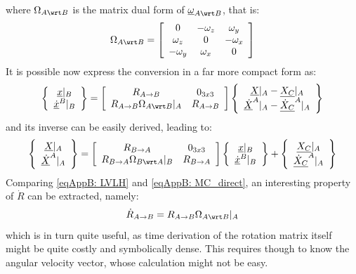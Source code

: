 	\noindent where $\Omega_{A\wrt B}$ is the matrix dual form of $\underline{\omega}_{A \wrt B}$, that is:
	\[
	\Omega_{A\wrt B} = \left[ \begin{array}{ccc}
			0 			& -\omega_z & \omega_y \\
			\omega_z 	& 0 		& -\omega_x \\
			-\omega_y 	& \omega_x 	& 0
			\end{array}\right]
	\]
	\indent It is possible now express the conversion in a far more compact form as:
	\begin{equation}
	\left\{ \begin{array}{c}
	\underline{x}\rvert_{B} \\
	\underline{\dot{x}}^{B}\rvert_{B}
	\end{array} \right\}
	= 
	\left[\begin{array}{cc}
	R_{A\to B} 								& 0_{3x3} \\
	R_{A\to B} \Omega_{A \wrt B} \rvert_{A} & R_{A\to B} 
	\end{array}\right]
	\left\{ \begin{array}{c}
	\underline{X}\rvert_{A} - \underline{X_C}\rvert_{A}\\
	\underline{\dot{X}}^{A}\rvert_{A} - \underline{\dot{X}_C}^{A}\rvert_{A}
	\end{array}\right\}
	\label{eqAppB: 	MC_direct}
	\end{equation}
	\noindent and its inverse can be easily derived, leading to:
	\begin{equation}
	\left\{ \begin{array}{c}
	\underline{X}\rvert_{A} \\
	\underline{\dot{X}}^{A}\rvert_{A}
	\end{array} \right\}
	= 
	\left[\begin{array}{cc}
	R_{B\to A} & 0_{3x3} \\
	R_{B\to A} \Omega_{B\wrt A} \rvert_{B} & R_{B\to A} 
	\end{array}\right]
	\left\{ \begin{array}{c}
	\underline{x}\rvert_{B} \\
	\underline{\dot{x}}^{B}\rvert_{B}
	\end{array}\right\} + 
	\left\{ \begin{array}{c}
	\underline{X_C}\rvert_{A} \\
	\underline{\dot{X}_C}^{A}\rvert_{A}
	\end{array} \right\}
	\label{eqAppB: 	MC_inverse}
	\end{equation}
	\indent Comparing \eqref{eqAppB: 	LVLH} and \eqref{eqAppB: 	MC_direct}, an interesting property of $\dot{R}$ can be extracted, namely:
	\[
	\dot{R}_{A \to B} = R_{A\to B} \Omega_{A \wrt B} \rvert_{A}
	\]
	\noindent which is in turn quite useful, as time derivation of the rotation matrix itself might be quite costly and symbolically dense. This requires though to know the angular velocity vector, whose calculation might not be easy.
